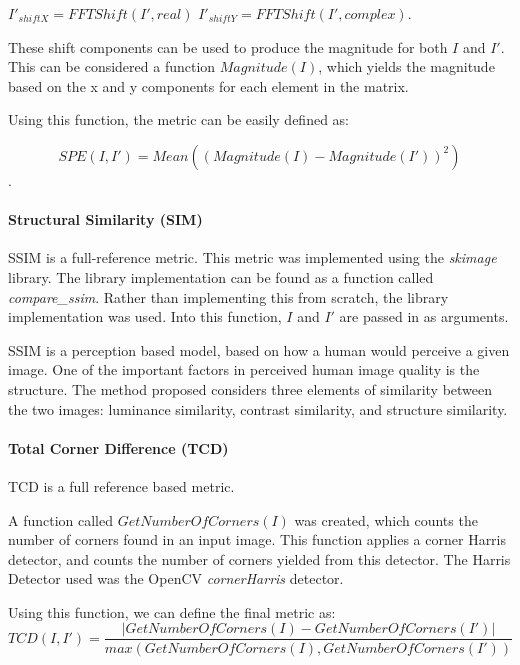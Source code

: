 \documentclass[10pt,a4paper]{article}
\begin{document}
                $I'_{shiftX} = FFTShift(I', real)$
                $I'_{shiftY} = FFTShift(I', complex)$.

                These shift components can be used to produce the magnitude for both $I$ and $I'$. This can be considered a function $Magnitude(I)$, which yields the magnitude based on the
                x and y components for each element in the matrix.

                Using this function, the metric can be easily defined as:

                $$SPE(I, I') = Mean((Magnitude(I) - Magnitude(I'))^2)$$.

            \paragraph{Structural Similarity (SIM)}
                SSIM is a full-reference metric. This metric was implemented using the \emph{skimage} library. The library implementation can be found as a function called \emph{compare\_ssim}.
                Rather than implementing this from scratch, the library implementation was used. Into this function, $I$ and $I'$ are passed in as arguments.

                SSIM is a perception based model, based on how a human would perceive a given image. One of the important factors in perceived human image quality is the structure.
                The method proposed considers three elements of similarity between the two images: luminance similarity, contrast similarity, and structure similarity.
                \cite{SSIMPaper}

            \paragraph{Total Corner Difference (TCD)}
                TCD is a full reference based metric. 
                
                A function called $GetNumberOfCorners(I)$ was created, which counts the number of corners found in an input image. This function applies a corner Harris detector,
                and counts the number of corners yielded from this detector. The Harris Detector used was the OpenCV \emph{cornerHarris} detector. 

                Using this function, we can define the final metric as: 
                $$TCD(I, I') = \frac{|GetNumberOfCorners(I) - GetNumberOfCorners(I')|}{max({GetNumberOfCorners(I), GetNumberOfCorners(I')})}$$
\end{document}

